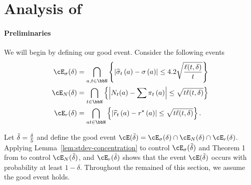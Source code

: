 \appendix
\onecolumn

\section{Analysis of \mainalgname}

    \paragraph{Preliminaries}

    We will begin by defining our good event.
    Consider the following events
    \begin{align}
        \goodEvent_{\sigma}(\errorProb) &= \bigcap_{\aidx, \round \in \bbN} \cbrk{\abs{\empstdev[\round][\aidx] - \stdev[\aidx]} \leq 4.2\sqrt{\frac{\ell(\round, \errorProb)}{\round}}} \\
        \goodEvent_{N}(\errorProb) &= \bigcap_{\round \in \bbN} \cbrk{\abs{\acount{\round}{\aidx} - \sum \policy[\round][\aidx]} \leq \sqrt{\round \ell(\round, \errorProb)}} \\
        \goodEvent_{r}(\errorProb) &= \bigcap_{\aidx \round \in \bbN} \cbrk{\abs{\predReward[\round][\aidx] - \trueReward[\aidx]} \leq \sqrt{\round \ell(\round, \errorProb)}}.
    \end{align}

    Let $\tilde {\delta} = \frac{\delta}{5}$ and define the good event $\goodEvent(\tilde \errorProb) =  \goodEvent_{\sigma}(\errorProb) \cap \goodEvent_{N}(\errorProb) \cap  \goodEvent_{r}(\errorProb)$. 
    Applying Lemma~\ref{lem:stdev-concentration} to control $\goodEvent_{\sigma}(\tilde \errorProb)$ and Theorem 1 from \cite{Howard2018TimeUniform} to control $\goodEvent_{N}(\tilde \errorProb)$, and $\goodEvent_{r}(\tilde \errorProb)$
    shows that the event $\goodEvent(\tilde \errorProb)$ occurs with probability at least $1 - \delta$.
    Throughout the remained of this section, we assume the good event holds.

